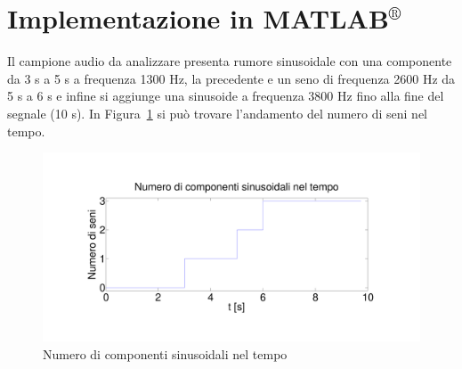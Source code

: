\documentclass[10pt,A4]{article}
\begin{document}
\clearpage

\section{Implementazione in MATLAB$^{\circledR}$}
Il campione audio da analizzare presenta rumore sinusoidale con una componente da 3 s a 5 s a frequenza 1300 Hz, la precedente e un seno di frequenza 2600 Hz da 5 s a 6 s e infine si aggiunge una sinusoide a frequenza 3800 Hz fino alla fine del segnale (10 s). In Figura~\ref{fig:nsins} si può trovare l'andamento del numero di seni nel tempo.\\

\begin{figure}[h!]
  \centering
  \includegraphics[width=\textwidth, trim = 0 90 0 90, clip = true,  keepaspectratio]{images/seniTempo.pdf}
  \caption{Numero di componenti sinusoidali nel tempo}
  \label{fig:nsins}
\end{figure}
\end{document}
